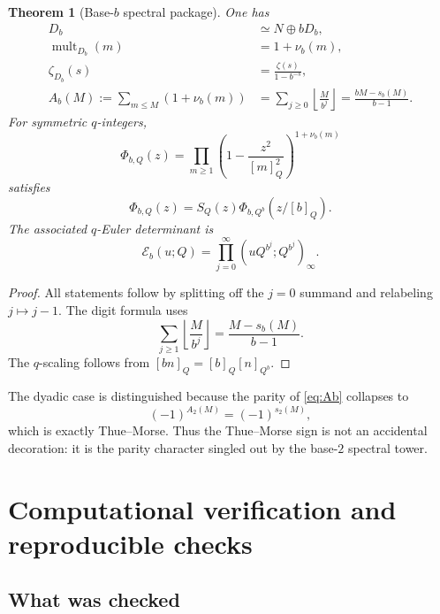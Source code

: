\documentclass[11pt,oneside]{article}
\numberwithin{equation}{section}
\theoremstyle{plain}
\newtheorem{theorem}{Theorem}[section]
\theoremstyle{definition}
\theoremstyle{remark}
\newcommand{\Ecal}{\mathscr E}
\begin{document}
\begin{theorem}[Base-$b$ spectral package]\label{thm:base-b}
One has
\begin{align}
 D_b&\simeq N\oplus bD_b,\label{eq:Db-scale}\\
 \operatorname{mult}_{D_b}(m)&=1+\nu_b(m),\label{eq:mb}\\
 \zeta_{D_b}(s)&=\frac{\zeta(s)}{1-b^{-s}},\label{eq:zetab}\\
 A_b(M):=\sum_{m\le M}(1+\nu_b(m))
 &=\sum_{j\ge0}\left\lfloor\frac{M}{b^j}\right\rfloor
 =\frac{bM-s_b(M)}{b-1}.\label{eq:Ab}
\end{align}
For symmetric $q$-integers,
\begin{equation}\label{eq:PhibQ}
 \Phi_{b,Q}(z)=\prod_{m\ge1}
 \left(1-\frac{z^2}{[m]_Q^2}\right)^{1+\nu_b(m)}
\end{equation}
satisfies
\begin{equation}\label{eq:PhibQ-scale}
 \Phi_{b,Q}(z)=S_Q(z)
 \Phi_{b,Q^b}\!\left(z/[b]_Q\right).
\end{equation}
The associated $q$-Euler determinant is
\begin{equation}\label{eq:Eb}
 \Ecal_b(u;Q)=\prod_{j=0}^{\infty}
 (uQ^{b^j};Q^{b^j})_\infty.
\end{equation}
\end{theorem}

\begin{proof}
All statements follow by splitting off the $j=0$ summand and relabeling $j\mapsto j-1$.  The digit formula uses
\[
 \sum_{j\ge1}\left\lfloor\frac{M}{b^j}\right\rfloor
 =\frac{M-s_b(M)}{b-1}.
\]
The $q$-scaling follows from $[bn]_Q=[b]_Q[n]_{Q^b}$.
\end{proof}

The dyadic case is distinguished because the parity of \cref{eq:Ab} collapses to
\[
 (-1)^{A_2(M)}=(-1)^{s_2(M)},
\]
which is exactly Thue--Morse.  Thus the Thue--Morse sign is not an accidental decoration: it is the parity character singled out by the base-$2$ spectral tower.

\section{Computational verification and reproducible checks}

\subsection{What was checked}
\end{document}
